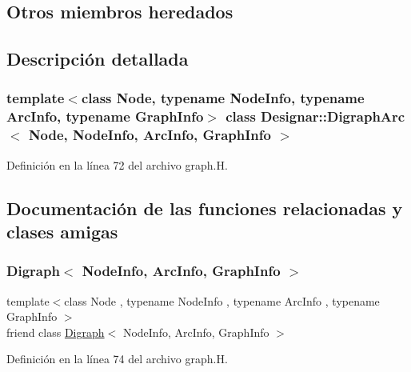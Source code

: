 \subsection*{Otros miembros heredados}


\subsection{Descripción detallada}
\subsubsection*{template$<$class Node, typename Node\+Info, typename Arc\+Info, typename Graph\+Info$>$\newline
class Designar\+::\+Digraph\+Arc$<$ Node, Node\+Info, Arc\+Info, Graph\+Info $>$}



Definición en la línea 72 del archivo graph.\+H.



\subsection{Documentación de las funciones relacionadas y clases amigas}
\mbox{\label{class_designar_1_1_digraph_arc_abc8f370e4ec7084a6574cf967a5a5aaf}} 
\subsubsection{\texorpdfstring{Digraph$<$ Node\+Info, Arc\+Info, Graph\+Info $>$}{Digraph< NodeInfo, ArcInfo, GraphInfo >}}
{\footnotesize\ttfamily template$<$class Node , typename Node\+Info , typename Arc\+Info , typename Graph\+Info $>$ \\
friend class \hyperlink{class_designar_1_1_digraph}{Digraph}$<$ Node\+Info, Arc\+Info, Graph\+Info $>$\hspace{0.3cm}{\ttfamily [friend]}}



Definición en la línea 74 del archivo graph.\+H.

\mbox{\label{class_designar_1_1_digraph_arc_a1d0cecb0e630aa2aa8179b2afdd92a8b}} 
